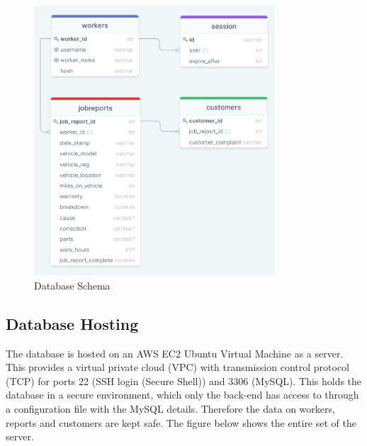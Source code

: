\begin{figure}[H]
    \caption{Database Schema}
    \label{image:db}
    \centering
    \includegraphics[width=0.8\textwidth]{images/database/database.png}
\end{figure}

\subsection{Database Hosting}
The database is hosted on an AWS EC2 Ubuntu Virtual Machine as a server. This provides a virtual private cloud (VPC) with transmission control protocol (TCP) for ports 22 (SSH login (Secure Shell)) and 3306 (MySQL). This holds the database in a secure environment, which only the back-end has access to through a configuration file with the MySQL details. Therefore the data on workers, reports and customers are kept safe. The figure below shows the entire set of the server.

